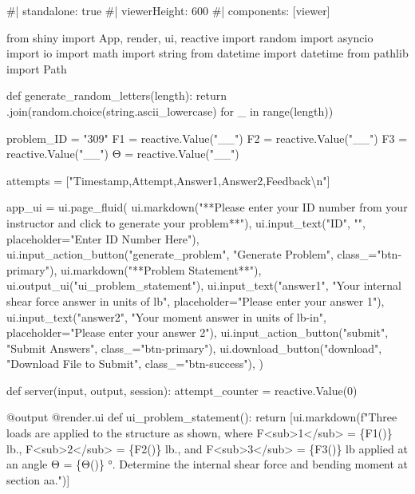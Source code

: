 \documentclass[
  letterpaper,
  DIV=11,
  numbers=noendperiod]{scrreprt}
\newenvironment{Shaded}{\begin{snugshade}}{\end{snugshade}}
\newcommand{\NormalTok}[1]{\textcolor[rgb]{0.00,0.23,0.31}{#1}}
\begin{document}
\begin{Shaded}
\begin{Highlighting}[]
\NormalTok{\#| standalone: true}
\NormalTok{\#| viewerHeight: 600}
\NormalTok{\#| components: [viewer]}

\NormalTok{from shiny import App, render, ui, reactive}
\NormalTok{import random}
\NormalTok{import asyncio}
\NormalTok{import io}
\NormalTok{import math}
\NormalTok{import string}
\NormalTok{from datetime import datetime}
\NormalTok{from pathlib import Path}

\NormalTok{def generate\_random\_letters(length):}
\NormalTok{    return \textquotesingle{}\textquotesingle{}.join(random.choice(string.ascii\_lowercase) for \_ in range(length))}

\NormalTok{problem\_ID = "309"}
\NormalTok{F1 = reactive.Value("\_\_")}
\NormalTok{F2 = reactive.Value("\_\_")}
\NormalTok{F3 = reactive.Value("\_\_")}
\NormalTok{Θ = reactive.Value("\_\_")}

\NormalTok{attempts = ["Timestamp,Attempt,Answer1,Answer2,Feedback\textbackslash{}n"]}

\NormalTok{app\_ui = ui.page\_fluid(}
\NormalTok{    ui.markdown("**Please enter your ID number from your instructor and click to generate your problem**"),}
\NormalTok{    ui.input\_text("ID", "", placeholder="Enter ID Number Here"),}
\NormalTok{    ui.input\_action\_button("generate\_problem", "Generate Problem", class\_="btn{-}primary"),}
\NormalTok{    ui.markdown("**Problem Statement**"),}
\NormalTok{    ui.output\_ui("ui\_problem\_statement"),}
\NormalTok{    ui.input\_text("answer1", "Your internal shear force answer in units of lb", placeholder="Please enter your answer 1"),}
\NormalTok{    ui.input\_text("answer2", "Your moment answer in units of lb{-}in", placeholder="Please enter your answer 2"),}
\NormalTok{    ui.input\_action\_button("submit", "Submit Answers", class\_="btn{-}primary"),}
\NormalTok{    ui.download\_button("download", "Download File to Submit", class\_="btn{-}success"),}
\NormalTok{)}

\NormalTok{def server(input, output, session):}
\NormalTok{    attempt\_counter = reactive.Value(0)}

\NormalTok{    @output}
\NormalTok{    @render.ui}
\NormalTok{    def ui\_problem\_statement():}
\NormalTok{        return [ui.markdown(f"Three loads are applied to the structure as shown, where F\textless{}sub\textgreater{}1\textless{}/sub\textgreater{} = \{F1()\} lb., F\textless{}sub\textgreater{}2\textless{}/sub\textgreater{} = \{F2()\} lb., and F\textless{}sub\textgreater{}3\textless{}/sub\textgreater{} = \{F3()\} lb applied at an angle Θ = \{Θ()\} °. Determine the internal shear force and bending moment at section aa.")]}


\end{Highlighting}
\end{Shaded}
\end{document}
